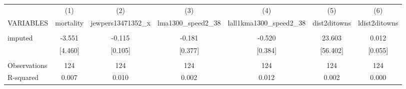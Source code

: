 \documentclass[landscape]{article}
\begin{document}
\begin{tabular}{lcccccc} \hline
 & (1) & (2) & (3) & (4) & (5) & (6) \\
VARIABLES & mortality & jewpers13471352\_x & lma1300\_speed2\_38 & lall1kma1300\_speed2\_38 & dist2ditowns & ldist2ditowns \\ \hline
 &  &  &  &  &  &  \\
imputed & -3.551 & -0.115 & -0.181 & -0.520 & 23.603 & 0.012 \\
 & [4.460] & [0.105] & [0.377] & [0.384] & [56.402] & [0.055] \\
 &  &  &  &  &  &  \\
Observations & 124 & 124 & 124 & 124 & 124 & 124 \\
 R-squared & 0.007 & 0.010 & 0.002 & 0.012 & 0.002 & 0.000 \\ \hline
\end{tabular}
\end{document}
